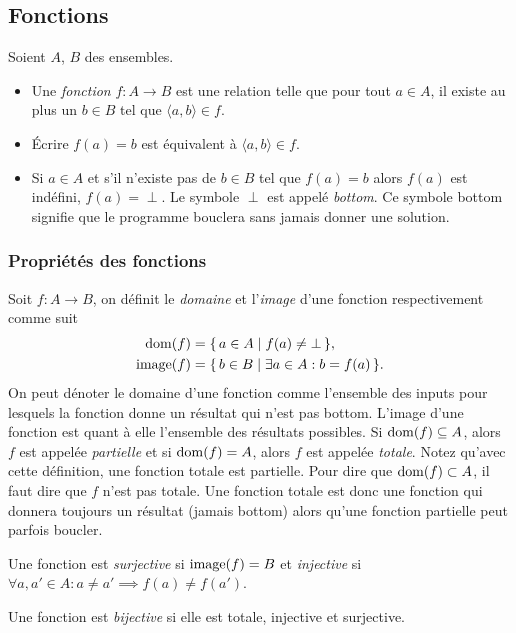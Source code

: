 
\subsection{Fonctions}
\label{subsec:fonctions}
Soient $A$, $B$ des ensembles.
\begin{itemize}
  	\item Une \emph{fonction} $f \colon A \rightarrow B$ est une relation telle que pour tout $a \in
	A$, il existe au plus un $b \in B$ tel que $\langle a,b \rangle \in f$.
	\item Écrire $f(a)=b$ est équivalent à $\langle a,b \rangle \in f$.
	\item Si $a \in A$ et s'il n'existe pas de $b \in B$ tel que $f(a)=b$ alors $f(a)$ est indéfini,
		$f(a) = \perp$. Le symbole $\perp$ est appelé \emph{bottom}. Ce symbole bottom signifie que le programme bouclera sans jamais donner une solution.
\end{itemize}

\subsubsection{Propriétés des fonctions}
\label{par:proprietes_des_fonctions}
Soit $f\colon A \to B$, on définit le \emph{domaine} et l'\emph{image} d'une fonction respectivement comme suit
\begin{align*}
  \operatorname{dom}(f)   & = \{\, a \in A \mid f(a) \neq \bot \,\},\\
  \operatorname{image}(f) & = \{\, b \in B \mid \exists a \in A : b = f(a) \,\}.
\end{align*}
On peut dénoter le domaine d'une fonction comme l'ensemble des inputs pour lesquels la fonction donne un résultat qui n'est pas bottom. L'image d'une fonction est quant à elle l'ensemble des résultats possibles.
Si $\operatorname{dom}(f) \subseteq A$, alors $f$ est appelée \emph{partielle} et si $\operatorname{dom}(f) = A$, alors $f$ est appelée \emph{totale}.
Notez qu'avec cette définition, une fonction totale est partielle.
Pour dire que $\operatorname{dom}(f) \subset A$, il faut dire que $f$ n'est pas totale.
Une fonction totale est donc une fonction qui donnera toujours un résultat (jamais bottom) alors qu'une fonction partielle peut parfois boucler.

Une fonction est \emph{surjective} si $\operatorname{image}(f) = B$ et \emph{injective} si $\forall a,a' \in A : a \neq a' \implies f(a) \neq f(a')$.

Une fonction est \emph{bijective} si elle est totale, injective et surjective.

